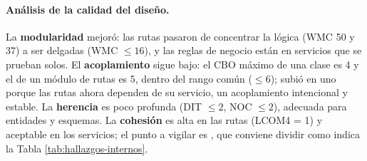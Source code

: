 \paragraph{Análisis de la calidad del diseño.} La \textbf{modularidad} mejoró: las rutas pasaron de concentrar la lógica (WMC 50 y 37) a ser delgadas (WMC $\leq 16$), y las reglas de negocio están en servicios que se prueban solos. El \textbf{acoplamiento} sigue bajo: el CBO máximo de una clase es 4 y el de un módulo de rutas es 5, dentro del rango común ($\leq 6$); subió en uno porque las rutas ahora dependen de su servicio, un acoplamiento intencional y estable. La \textbf{herencia} es poco profunda (DIT $\leq 2$, NOC $\leq 2$), adecuada para entidades y esquemas. La \textbf{cohesión} es alta en las rutas (LCOM4 = 1) y aceptable en los servicios; el punto a vigilar es , que conviene dividir como indica la Tabla \ref{tab:hallazgos-internos}.
